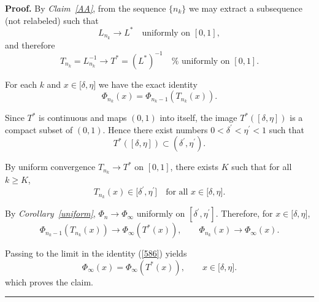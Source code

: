 \documentclass[onecolumn]{article}
\newenvironment{proof}[1][Proof]{\noindent\textbf{#1.} }{\ \rule{0.5em}{0.5em}}
\begin{document}
\begin{proof}
By \textit{Claim~\ref{AA}}, from the sequence $\{n_{k}\}$ we may extract a
subsequence (not relabeled) such that 
\begin{equation}
L_{n_{k}}\rightarrow L^{\ast }\quad \text{uniformly on }[0,1],  \label{584}
\end{equation}%
and therefore 
\begin{equation}
T_{n_{k}}=L_{n_{k}}^{-1}\rightarrow T^{\ast }=(L^{\ast })^{-1}\quad \text{%
uniformly on }[0,1].  \label{585}
\end{equation}

For each $k$ and $x\in \lbrack \delta ,\eta ]$ we have the exact identity 
\begin{equation}
\Phi _{n_{k}}(x)=\Phi _{n_{k}-1}(T_{n_{k}}(x)).  \label{586}
\end{equation}

Since $T^{\ast }$ is continuous and maps $(0,1)$ into itself, the image $%
T^{\ast }([\delta ,\eta ])$ is a compact subset of $(0,1)$. Hence there
exist numbers $0<\delta ^{\prime }<\eta ^{\prime }<1$ such that 
\begin{equation}
T^{\ast }([\delta ,\eta ])\subset (\delta ^{\prime },\eta ^{\prime }).
\label{587}
\end{equation}

By uniform convergence $T_{n_{k}}\rightarrow T^{\ast }$ on $[0,1]$, there
exists $K$ such that for all $k\geq K$, 
\begin{equation}
T_{n_{k}}(x)\in \lbrack \delta ^{\prime },\eta ^{\prime }]\quad \text{for
all }x\in \lbrack \delta ,\eta ].  \label{588}
\end{equation}

By \textit{Corollary~\ref{uniform}}, $\Phi _{n}\rightarrow \Phi _{\infty }$
uniformly on $[\delta ^{\prime },\eta ^{\prime }]$. Therefore, for $x\in
\lbrack \delta ,\eta ]$, 
\begin{equation}
\Phi _{n_{k}-1}(T_{n_{k}}(x))\rightarrow \Phi _{\infty }(T^{\ast
}(x)),\qquad \Phi _{n_{k}}(x)\rightarrow \Phi _{\infty }(x).  \label{588a}
\end{equation}

Passing to the limit in the identity (\ref{586}) yields 
\begin{equation}
\Phi _{\infty }(x)=\Phi _{\infty }(T^{\ast }(x)),\qquad x\in \lbrack \delta
,\eta ].  \label{588b}
\end{equation}%
which proves the claim.
\end{proof}
\end{document}

